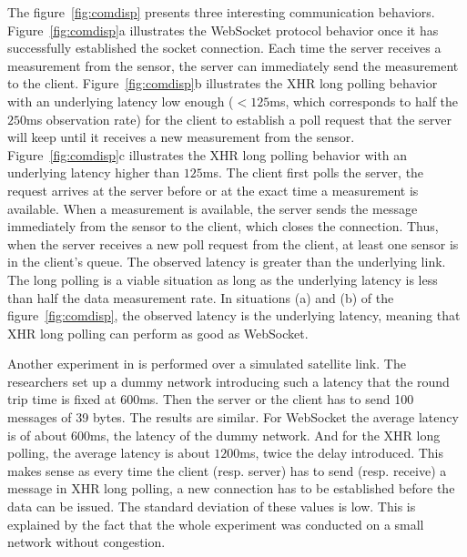\documentclass[10pt,journal,compsoc]{IEEEtran}
\newcommand{\ws}{WebSocket}
\begin{document}
The figure~\ref{fig:comdisp} presents three interesting communication behaviors.
Figure~\ref{fig:comdisp}a illustrates the \ws{} protocol behavior once it has successfully established the socket connection. Each time the server receives a measurement from the sensor, the server can immediately send the measurement to the client.
Figure~\ref{fig:comdisp}b illustrates the XHR long polling behavior with an underlying latency low enough ($< 125 $ms, which corresponds to half the $250$ms observation rate) for the client to establish a poll request that the server will keep until it receives a new measurement from the sensor. %
Figure~\ref{fig:comdisp}c illustrates the XHR long polling behavior with an underlying latency higher than $125$ms.
The client first polls the server, the request arrives at the server before or at the exact time a measurement is available.
When a measurement is available, the server sends the message immediately from the sensor to the client, which closes the connection.
Thus, when the server receives a new poll request from the client, at least one sensor is in the client's queue.
The observed latency is greater than the underlying link.
The long polling is a viable situation as long as the underlying latency is less than half the data measurement rate.
In  situations (a) and (b) of the figure~\ref{fig:comdisp}, the observed latency is the underlying latency, meaning that XHR long polling can perform as good as \ws{}.



Another experiment in \cite{collinalatency} is performed over a simulated satellite link.
The researchers set up a dummy network introducing such a latency that the round trip time is fixed at $600$ms.
Then the server or the client has to send 100 messages of 39 bytes. The results are similar.
For \ws{} the average latency is of about $600$ms, the latency of the dummy network. And for the XHR long polling, the average latency is about $1200$ms, twice the delay introduced.
This makes sense as every time the client (resp. server) has to send (resp. receive) a message in XHR long polling, a new connection has to be established before the data can be issued.
The standard deviation of these values is low.
This is explained by the fact that the whole experiment was conducted on a small network without congestion.
\end{document}

